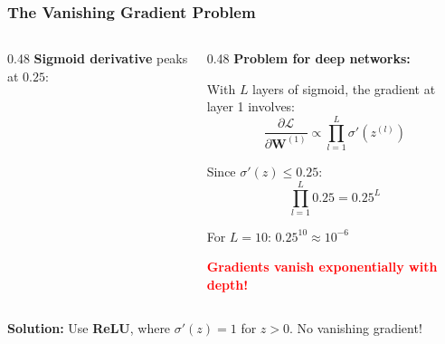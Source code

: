 \documentclass[notes,11pt, aspectratio=169]{beamer}
\newcommand{\vW}{\mathbf{W}}
\newcommand{\pd}[2]{\frac{\partial #1}{\partial #2}}
\begin{document}
\begin{frame}
\frametitle{The Vanishing Gradient Problem}

\begin{columns}[T]
\begin{column}{0.48\textwidth}
\textbf{Sigmoid derivative} peaks at $0.25$:

\begin{center}
\end{center}
\end{column}

\begin{column}{0.48\textwidth}
\textbf{Problem for deep networks:}

With $L$ layers of sigmoid, the gradient at layer 1 involves:
\[
    \pd{\mathcal{L}}{\vW^{(1)}} \propto \prod_{l=1}^{L} \sigma'(z^{(l)})
\]

\vspace{4pt}
Since $\sigma'(z) \leq 0.25$:
\[
    \prod_{l=1}^{L} 0.25 = 0.25^L
\]

\vspace{4pt}
For $L = 10$: $0.25^{10} \approx 10^{-6}$

\vspace{6pt}
\textcolor{red}{\textbf{Gradients vanish exponentially with depth!}}
\end{column}
\end{columns}

\vspace{4pt}
\textbf{Solution:} Use \textbf{ReLU}, where $\sigma'(z) = 1$ for $z > 0$. No vanishing gradient!
\end{frame}
\end{document}
